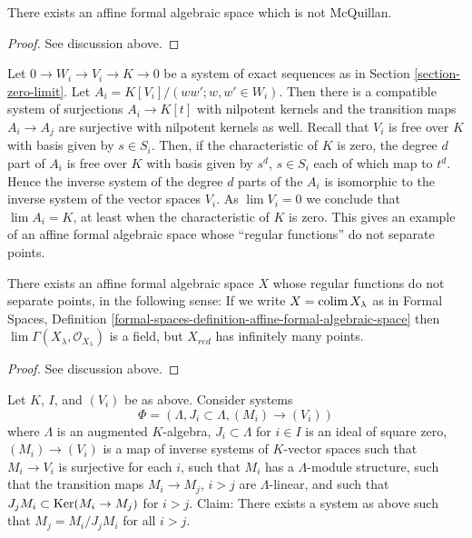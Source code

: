 \begin{lemma}
\label{lemma-affine-not-mcquillan}
There exists an affine formal algebraic space which is not McQuillan.
\end{lemma}

\begin{proof}
See discussion above.
\end{proof}

\noindent
Let $0 \to W_i \to V_i \to K \to 0$ be a system of exact sequences
as in Section \ref{section-zero-limit}. Let
$A_i = K[V_i]/(ww'; w, w' \in W_i)$.
Then there is a compatible system of surjections $A_i \to K[t]$
with nilpotent kernels and
the transition maps $A_i \to A_j$ are surjective with nilpotent
kernels as well. Recall that $V_i$ is free over $K$ with
basis given by $s \in S_i$. Then, if the characteristic of $K$ is zero,
the degree $d$ part of $A_i$ is free over $K$ with basis given by
$s^d$, $s \in S_i$ each of which map to $t^d$. Hence the inverse system of
the degree $d$ parts of the $A_i$ is isomorphic to the inverse
system of the vector spaces $V_i$. As $\lim V_i = 0$ we conclude that
$\lim A_i = K$, at least when the characteristic of $K$ is zero.
This gives an example of an affine formal algebraic space
whose ``regular functions'' do not separate points.

\begin{lemma}
\label{lemma-affine-formal-functions-do-not-separate-points}
There exists an affine formal algebraic space $X$
whose regular functions do not separate points, in the following sense:
If we write $X = \mathop{\mathrm{colim}}\nolimits X_\lambda$ as in
Formal Spaces, Definition
\ref{formal-spaces-definition-affine-formal-algebraic-space}
then $\lim \Gamma(X_\lambda, \mathcal{O}_{X_\lambda})$
is a field, but $X_{red}$ has infinitely many points.
\end{lemma}

\begin{proof}
See discussion above.
\end{proof}

\noindent
Let $K$, $I$, and $(V_i)$ be as above. Consider systems
$$
\Phi = (\Lambda, J_i \subset \Lambda, (M_i) \to (V_i))
$$
where $\Lambda$ is an augmented $K$-algebra,
$J_i \subset \Lambda$ for $i \in I$ is an ideal of square zero,
$(M_i) \to (V_i)$ is a map of inverse systems of $K$-vector spaces
such that $M_i \to V_i$ is surjective for each $i$, such that
$M_i$ has a $\Lambda$-module structure, such that the transition maps
$M_i \to M_j$, $i > j$ are $\Lambda$-linear, and such that
$J_j M_i \subset \mathop{\mathrm{Ker}}(M_i \to M_j)$ for $i > j$.
Claim: There exists a system as above such that $M_j = M_i/J_j M_i$
for all $i > j$.

